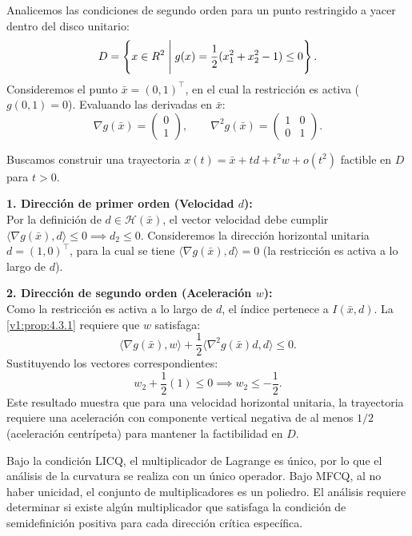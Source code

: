 \begin{example}\label{v1:exa:tangente_segundo_orden}
 Analicemos las condiciones de segundo orden para un punto restringido a yacer dentro del disco unitario:
 \[
 D = \left\{ x \in R^2 \mathrel{\Bigg|} g(x) = \frac{1}{2}(x_1^2 + x_2^2 - 1) \le 0 \right\}.
 \]
 Consideremos el punto $\bar{x} = (0, 1)^\top$, en el cual la restricción es activa ($g(0,1) = 0$). Evaluando las derivadas en $\bar{x}$:
 \[
 \nabla g(\bar{x}) = \begin{pmatrix} 0 \\ 1 \end{pmatrix}, \qquad \nabla^2 g(\bar{x}) = \begin{pmatrix} 1 & 0 \\ 0 & 1 \end{pmatrix}.
 \]
 
 Buscamos construir una trayectoria $x(t) = \bar{x} + td + t^2 w + o(t^2)$ factible en $D$ para $t > 0$.
 
 \textbf{1. Dirección de primer orden (Velocidad $d$):} \\
 Por la definición de $d \in \mathcal{H}(\bar{x})$, el vector velocidad debe cumplir $\langle \nabla g(\bar{x}), d \rangle \le 0 \implies d_2 \le 0$. Consideremos la dirección horizontal unitaria $d = (1, 0)^\top$, para la cual se tiene $\langle \nabla g(\bar{x}), d \rangle = 0$ (la restricción es activa a lo largo de $d$).
 
 \textbf{2. Dirección de segundo orden (Aceleración $w$):} \\
 Como la restricción es activa a lo largo de $d$, el índice pertenece a $I(\bar{x}, d)$. La \cref{v1:prop:4.3.1} requiere que $w$ satisfaga:
 \[
 \langle \nabla g(\bar{x}), w \rangle + \frac{1}{2} \langle \nabla^2 g(\bar{x}) d, d \rangle \le 0.
 \]
 Sustituyendo los vectores correspondientes:
 \[
 w_2 + \frac{1}{2}(1) \le 0 \implies w_2 \le -\frac{1}{2}.
 \]
 Este resultado muestra que para una velocidad horizontal unitaria, la trayectoria requiere una aceleración con componente vertical negativa de al menos $1/2$ (aceleración centrípeta) para mantener la factibilidad en $D$.
\end{example}

\begin{notabox}
 Bajo la condición LICQ, el multiplicador de Lagrange es único, por lo que el análisis de la curvatura se realiza con un único operador. Bajo MFCQ, al no haber unicidad, el conjunto de multiplicadores es un poliedro. El análisis requiere determinar si existe algún multiplicador que satisfaga la condición de semidefinición positiva para cada dirección crítica específica.
\end{notabox}

